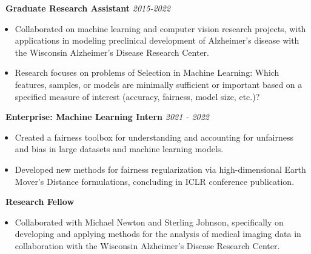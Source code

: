 \documentclass[]{article}
\begin{document}
 \newline
{\bf \ Graduate Research Assistant} \hfill \textit{2015-2022}
\begin{itemize}[label={$\bullet$}]
	\item Collaborated on machine learning and computer vision research projects, with applications in modeling preclinical development of Alzheimer's disease with the Wisconsin Alzheimer's Disease Research Center.
	\item Research focuses on problems of Selection in Machine Learning: Which features, samples, or models are minimally sufficient or important based on a specified measure of interest (accuracy, fairness, model size, etc.)?
\end{itemize} 

 \newline
{\bf \ Enterprise: Machine Learning Intern} \hfill \textit{2021 - 2022}
\begin{itemize}[label={$\bullet$}]
	\item Created a fairness toolbox for understanding and accounting for unfairness and bias in large datasets and machine learning models.
	\item Developed new methods for fairness regularization via high-dimensional Earth Mover's Distance formulations, concluding in ICLR conference publication.
\end{itemize}

\iffalse
{} \newline
{\bf \ Research Fellow}
\begin{itemize}[label={$\bullet$}]
	\item Collaborated with Michael Newton and Sterling Johnson, specifically on developing and applying methods for the analysis of medical imaging data in collaboration with the Wisconsin Alzheimer's Disease Research Center.
\end{itemize} 
\end{document}
